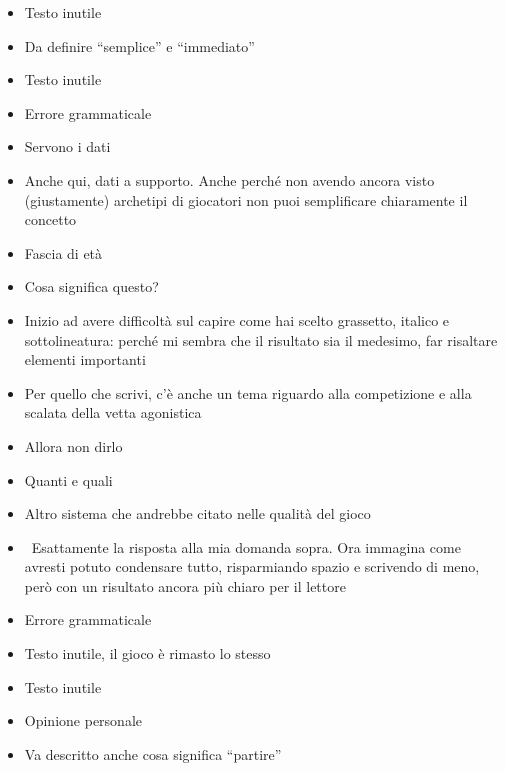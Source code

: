 {\begin{itemize}
  \item {} Testo inutile
  \item {} Da definire ``semplice'' e ``immediato''
  \item {} Testo inutile
  \item {} Errore grammaticale
  \item {} Servono i dati
  \item {} Anche qui, dati a supporto. Anche perché non avendo ancora visto (giustamente) archetipi di giocatori non puoi semplificare chiaramente il concetto
  \item {} Fascia di età
  \item {} Cosa significa questo?
  \item {} Inizio ad avere difficoltà sul capire come hai scelto grassetto, italico e sottolineatura: perché mi sembra che il risultato sia il medesimo, far risaltare elementi importanti
  \item {} Per quello che scrivi, c'è anche un tema riguardo alla competizione e alla scalata della vetta agonistica
  \item {} Allora non dirlo
  \item {} Quanti e quali
  \item {} Altro sistema che andrebbe citato nelle qualità del gioco
  \item {} \rvBene\ Esattamente la risposta alla mia domanda sopra. Ora immagina come avresti potuto condensare tutto, risparmiando spazio e scrivendo di meno, però con un risultato ancora più chiaro per il lettore
  \item {} Errore grammaticale
  \item {} Testo inutile, il gioco è rimasto lo stesso
  \item {} Testo inutile
  \item {} Opinione personale
  \item {} Va descritto anche cosa significa ``partire''

\end{itemize}}
